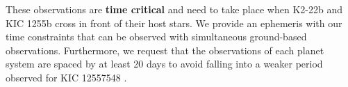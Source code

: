 \documentclass[letterpaper,12pt]{article}
\begin{document}

These observations are \textbf{time critical} and need to take place when K2-22b and KIC 1255b cross in front of their host stars.
We provide an ephemeris with our time constraints that can be observed with simultaneous ground-based observations.
Furthermore, we request that the observations of each planet system are spaced by at least 20 days to avoid falling into a weaker period observed for KIC 12557548 \citep{vanWerkhoven2014}.

%
%
%
%
%
\end{document}
